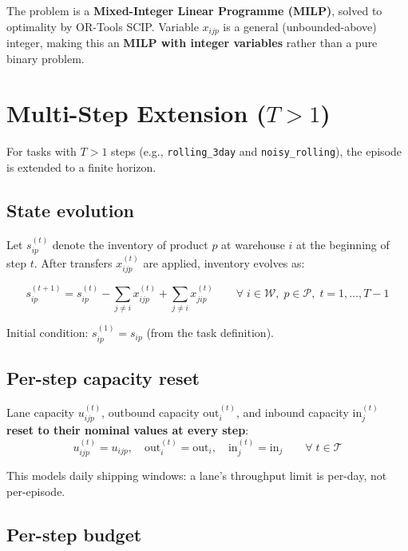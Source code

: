\documentclass[11pt, a4paper]{article}
\begin{document}
The problem is a \textbf{Mixed-Integer Linear Programme (MILP)}, solved
to optimality by OR-Tools SCIP.  Variable $x_{ijp}$ is a general
(unbounded-above) integer, making this an \textbf{MILP with integer
variables} rather than a pure binary problem.

\section{Multi-Step Extension ($T > 1$)}

For tasks with $T > 1$ steps (e.g., \texttt{rolling\_3day} and
\texttt{noisy\_rolling}), the episode is extended to a finite horizon.

\subsection{State evolution}

Let $s_{ip}^{(t)}$ denote the inventory of product $p$ at warehouse $i$
at the beginning of step $t$.  After transfers $x_{ijp}^{(t)}$ are
applied, inventory evolves as:

\begin{equation}
  s_{ip}^{(t+1)}
  = s_{ip}^{(t)}
  - \sum_{j \neq i} x_{ijp}^{(t)}
  + \sum_{j \neq i} x_{jip}^{(t)}
  \qquad \forall\; i \in \mathcal{W},\; p \in \mathcal{P},\;
  t = 1, \ldots, T-1
  \label{eq:state-evolution}
\end{equation}

Initial condition: $s_{ip}^{(1)} = s_{ip}$ (from the task definition).

\subsection{Per-step capacity reset}

Lane capacity $u_{ijp}^{(t)}$, outbound capacity $\text{out}_i^{(t)}$,
and inbound capacity $\text{in}_j^{(t)}$ \textbf{reset to their nominal
values at every step}:
\begin{equation}
  u_{ijp}^{(t)} = u_{ijp}, \quad
  \text{out}_i^{(t)} = \text{out}_i, \quad
  \text{in}_j^{(t)} = \text{in}_j
  \qquad \forall\; t \in \mathcal{T}
\end{equation}

This models daily shipping windows: a lane's throughput limit is
per-day, not per-episode.

\subsection{Per-step budget}
\end{document}
